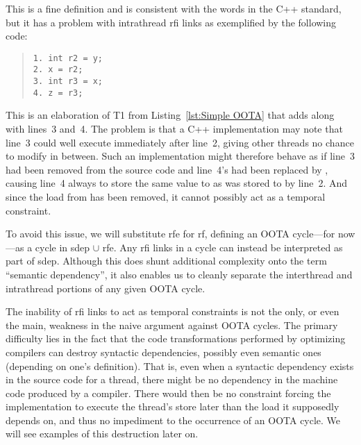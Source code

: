 This is a fine definition and is consistent with the words in the C++
standard, but it has a problem with intrathread rfi links
as exemplified by the following code:
\begin{quote}
\begin{verbatim}
1. int r2 = y;
2. x = r2;
3. int r3 = x;
4. z = r3;
\end{verbatim}
\end{quote}
This is an elaboration of T1 from
Listing~\ref{lst:Simple OOTA}
that adds  along with lines~3 and~4.
The problem is that a C++ implementation may
note that line~3 could well execute immediately after line~2, giving
other threads no chance to modify  in between.
Such an implementation might therefore behave as if line~3 had been
removed from the source code and line~4's  had been replaced by
,
causing line~4 always to store the same value to  as was stored
to  by line~2.
And since the load from  has been removed, it cannot possibly
act as a temporal constraint.

To avoid this issue, we will substitute rfe
for rf, defining an OOTA cycle---for now---as a cycle in sdep $\cup$ rfe.
Any rfi links in a cycle can instead be interpreted as part of sdep.
Although this does shunt additional complexity onto the term
``semantic dependency'', it also enables us to cleanly separate
the interthread and intrathread portions of any given OOTA cycle.


The inability of rfi links to act as temporal constraints is not the
only, or even the main, weakness in the naive argument against
OOTA cycles.
The primary difficulty lies in the fact that the code transformations
performed by optimizing compilers can destroy syntactic dependencies,
possibly even semantic ones (depending on one's definition).
That is, even when a syntactic dependency exists in the
source code for a thread, there might be no dependency in the machine
code produced by a compiler.
There would then be no constraint forcing the implementation to execute
the thread's store later than the load it supposedly depends on,
and thus no impediment to the occurrence of an OOTA cycle.
We will see examples of this destruction later on.

